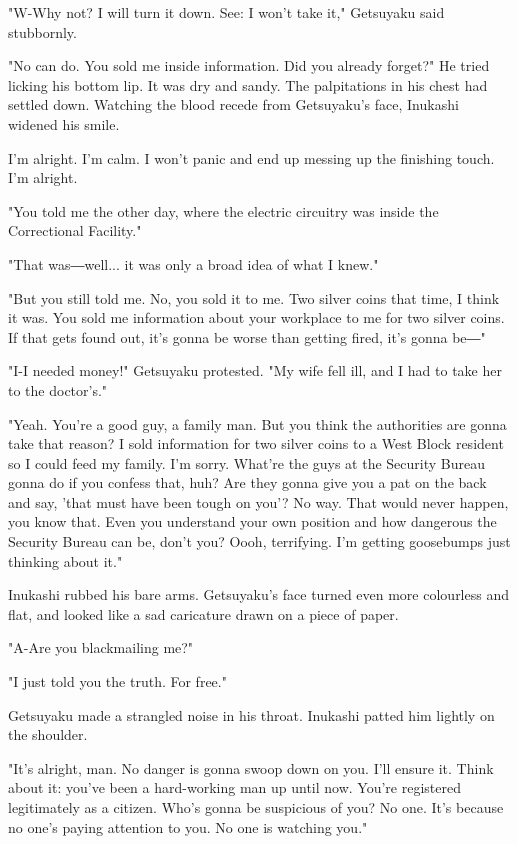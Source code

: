 "W-Why not? I will turn it down. See: I won't take it," Getsuyaku said
stubbornly.

"No can do. You sold me inside information. Did you already forget?" He
tried licking his bottom lip. It was dry and sandy. The palpitations in
his chest had settled down. Watching the blood recede from Getsuyaku's
face, Inukashi widened his smile.

I'm alright. I'm calm. I won't panic and end up messing up the finishing
touch. I'm alright.

"You told me the other day, where the electric circuitry was inside the
Correctional Facility."

"That was―well... it was only a broad idea of what I knew."

"But you still told me. No, you sold it to me. Two silver coins that
time, I think it was. You sold me information about your workplace to me
for two silver coins. If that gets found out, it's gonna be worse than
getting fired, it's gonna be―"

"I-I needed money!" Getsuyaku protested. "My wife fell ill, and I had to
take her to the doctor's."

"Yeah. You're a good guy, a family man. But you think the authorities
are gonna take that reason? I sold information for two silver coins to a
West Block resident so I could feed my family. I'm sorry. What're the
guys at the Security Bureau gonna do if you confess that, huh? Are they
gonna give you a pat on the back and say, 'that must have been tough on
you'? No way. That would never happen, you know that. Even you
understand your own position and how dangerous the Security Bureau can
be, don't you? Oooh, terrifying. I'm getting goosebumps just thinking
about it."

Inukashi rubbed his bare arms. Getsuyaku's face turned even more
colourless and flat, and looked like a sad caricature drawn on a piece
of paper.

"A-Are you blackmailing me?"

"I just told you the truth. For free."

Getsuyaku made a strangled noise in his throat. Inukashi patted him
lightly on the shoulder.

"It's alright, man. No danger is gonna swoop down on you. I'll ensure
it. Think about it: you've been a hard-working man up until now. You're
registered legitimately as a citizen. Who's gonna be suspicious of you?
No one. It's because no one's paying attention to you. No one is
watching you."

